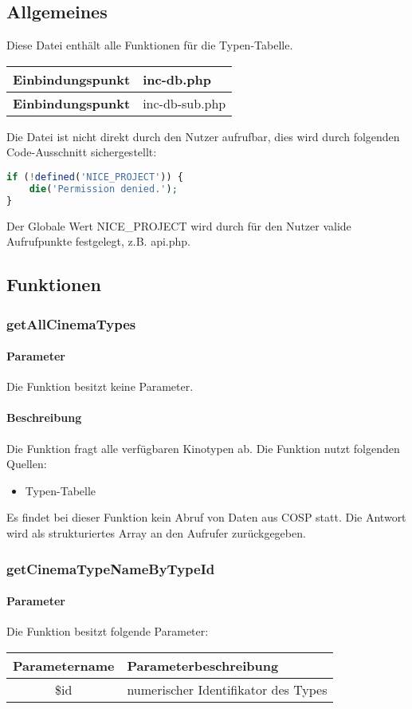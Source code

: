 \subsection{Allgemeines} Diese Datei enthält alle Funktionen für die Typen-Tabelle.
\begin{table}[H]
	\begin{tabular}{|c|p{11cm}|}
		\hline
		\textbf{Einbindungspunkt} & inc-db.php \\ \hline
		\textbf{Einbindungspunkt} & inc-db-sub.php \\ \hline
	\end{tabular}
\end{table}
Die Datei ist nicht direkt durch den Nutzer aufrufbar, dies wird durch folgenden Code-Ausschnitt sichergestellt:
\begin{lstlisting}[language=php]
if (!defined('NICE_PROJECT')) {
	die('Permission denied.');
}
\end{lstlisting}
Der Globale Wert {\glqq NICE\_PROJECT\grqq} wird durch für den Nutzer valide Aufrufpunkte festgelegt, z.B. {\glqq api.php\grqq}.
\newpage
\subsection{Funktionen}
\subsubsection{getAllCinemaTypes}
\paragraph{Parameter} Die Funktion besitzt keine Parameter.
\paragraph{Beschreibung} Die Funktion fragt alle verfügbaren Kinotypen ab. Die Funktion nutzt folgenden Quellen:
\begin{itemize}
	\item Typen-Tabelle
\end{itemize}
Es findet bei dieser Funktion kein Abruf von Daten aus {\glqq COSP\grqq} statt. Die Antwort wird als strukturiertes Array an den Aufrufer zurückgegeben.
\subsubsection{getCinemaTypeNameByTypeId}
\paragraph{Parameter} Die Funktion besitzt folgende Parameter:
\begin{table}[H]
	\begin{tabular}{|c|p{11cm}|}
		\hline
		\textbf{Parametername} & \textbf{Parameterbeschreibung} \\ \hline
		\$id & numerischer Identifikator des Types \\ \hline
	\end{tabular}
\end{table}
